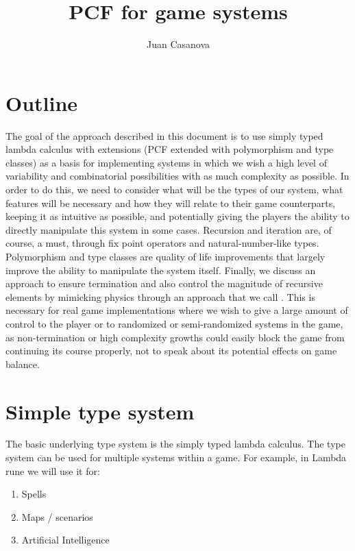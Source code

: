 \documentclass[12pt,a4paper]{article}
\title{PCF for game systems}
\author{Juan Casanova}
\begin{document}
\maketitle

\section{Outline}

The goal of the approach described in this document is to use simply typed lambda calculus with extensions (PCF \cite{PCF} extended with polymorphism and type classes) as a basis for implementing systems in which we wish a high level of variability and combinatorial possibilities with as much complexity as possible. In order to do this, we need to consider what will be the types of our system, what features will be necessary and how they will relate to their game counterparts, keeping it as intuitive as possible, and potentially giving the players the ability to directly manipulate this system in some cases. Recursion and iteration are, of course, a must, through fix point operators and natural-number-like types. Polymorphism and type classes are quality of life improvements that largely improve the ability to manipulate the system itself. Finally, we discuss an approach to ensure termination and also control the magnitude of recursive elements by mimicking physics through an approach that we call . This is necessary for real game implementations where we wish to give a large amount of control to the player or to randomized or semi-randomized systems in the game, as non-termination or high complexity growths could easily block the game from continuing its course properly, not to speak about its potential effects on game balance.

\section{Simple type system}

The basic underlying type system is the simply typed lambda calculus. The type system can be used for multiple systems within a game. For example, in Lambda rune we will use it for:

\begin{enumerate}

\item Spells
\item Maps / scenarios
\item Artificial Intelligence

\end{enumerate}
\end{document}
